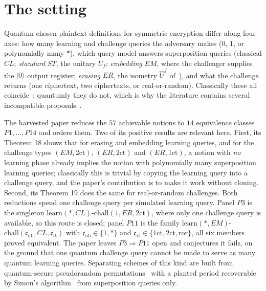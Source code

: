 \documentclass{conjura-conjecture}
\newcommand{\ror}{\mathrm{ror}}
\newcommand{\onect}{1\mathrm{ct}}
\newcommand{\twoct}{2\mathrm{ct}}
\newcommand{\learn}{\mathrm{learn}}
\newcommand{\chall}{\mathrm{chall}}
\newcommand{\cnb}{\mathfrak{c}_{\mathrm{nb}}}
\newcommand{\crt}{\mathfrak{c}_{\mathrm{rt}}}
\newcommand{\ket}[1]{|#1\rangle}
\newcommand{\NErOne}{\ensuremath{\learn(*,CL)}-\ensuremath{\chall(1,ER,\twoct)}}
\begin{document}
\section{The setting}\label{sec:setting}

Quantum chosen-plaintext definitions for symmetric encryption differ
along four axes: how many learning and challenge queries the adversary
makes ($0$, $1$, or polynomially many $*$), which query model answers
superposition queries (classical $CL$; \emph{standard} $ST$, the unitary
$U_f$; \emph{embedding} $EM$, where the challenger supplies the
$\ket{0}$ output register; \emph{erasing} $ER$, the isometry
$\hat U^{f}$ of~\cite{KKVB02}), and what the challenge returns (one
ciphertext, two ciphertexts, or real-or-random). Classically these all
coincide~\cite{BDJR97}; quantumly they do not, which is why the
literature contains several incompatible
proposals~\cite{BZ13b,GHS16,MS16}.

The harvested paper reduces the $57$ achievable notions to $14$
equivalence classes $P1,\dots,P14$ and orders them. Two of its positive
results are relevant here. First, its Theorem 18 shows that for erasing
and embedding learning queries, and for the challenge types
$(EM,\twoct)$, $(ER,\twoct)$ and $(ER,\onect)$, a notion with \emph{no}
learning phase already implies the notion with polynomially many
superposition learning queries; classically this is trivial by copying
the learning query into a challenge query, and the paper's contribution
is to make it work without cloning. Second, its Theorem 19 does the same
for real-or-random challenges. Both reductions spend one challenge query
per simulated learning query. Panel $P3$ is the singleton \NErOne,
where only one challenge query is available, so this route is closed;
panel $P11$ is the family $\learn(*,EM)$-$\chall(\cnb,CL,\crt)$ with
$\cnb\in\{1,*\}$ and $\crt\in\{\onect,\twoct,\ror\}$, all six members
proved equivalent. The paper leaves $P3\Rightarrow P11$ open and
conjectures it fails, on the ground that one quantum challenge query
cannot be made to serve as many quantum learning queries. Separating
schemes of this kind are built from quantum-secure pseudorandom
permutations~\cite{Zha16} with a planted period recoverable by Simon's
algorithm~\cite{Sim97} from superposition queries only.
\end{document}
